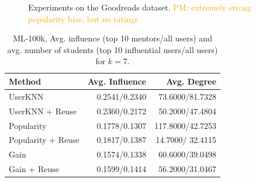 \documentclass[manuscript,review,anonymous]{acmart}
\newcommand{\pmu}[1]{
        \textcolor{orange}{PM: #1}}
\begin{document}
\begin{figure}[!htb]
    \centering
    \caption{Experiments on the Goodreads dataset. \pmu{extremely strong popularity bias, but no ratings}}
\end{figure}

\begin{table}[!htb]
    \centering
    \begin{tabular}{l r r}
        \toprule
        Method & Avg. Influence & Avg. Degree \\ \midrule
        UserKNN & 0.2541/0.2340 & 73.6000/81.7328 \\ 
        UserKNN + Reuse & 0.2360/0.2172 & 50.2000/47.4804 \\
        Popularity & 0.1778/0.1307 & 117.8000/42.7253 \\
        Popularity + Reuse & 0.1817/0.1387 & 14.7000/ 32.4115\\
        Gain & 0.1574/0.1338 & 60.6000/39.0498 \\
        Gain + Reuse & 0.1599/0.1414 & 56.2000/31.0467 \\ \bottomrule
    \end{tabular}
    \caption{ML-100k, Avg. influence (top 10 mentors/all users) and avg. number of students (top 10 influential users/all users) for $k=7$. }
\end{table}
\end{document}
